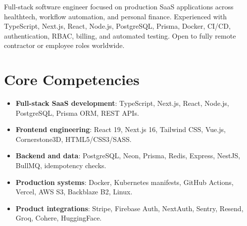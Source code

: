 \documentclass[11pt,a4paper,sans]{moderncv}
\begin{document}
\makecvtitle

\vspace{6pt}
\small{Full-stack software engineer focused on production SaaS applications across healthtech, workflow automation, and personal finance. Experienced with TypeScript, Next.js, React, Node.js, PostgreSQL, Prisma, Docker, CI/CD, authentication, RBAC, billing, and automated testing. Open to fully remote contractor or employee roles worldwide.}

\section{Core Competencies}
\vspace{1pt}
\begin{itemize}
\item \textbf{Full-stack SaaS development}: TypeScript, Next.js, React, Node.js, PostgreSQL, Prisma ORM, REST APIs.
\item \textbf{Frontend engineering}: React 19, Next.js 16, Tailwind CSS, Vue.js, Cornerstone3D, HTML5/CSS3/SASS.
\item \textbf{Backend and data}: PostgreSQL, Neon, Prisma, Redis, Express, NestJS, BullMQ, idempotency checks.
\item \textbf{Production systems}: Docker, Kubernetes manifests, GitHub Actions, Vercel, AWS S3, Backblaze B2, Linux.
\item \textbf{Product integrations}: Stripe, Firebase Auth, NextAuth, Sentry, Resend, Groq, Cohere, HuggingFace.
\end{itemize}
\end{document}
